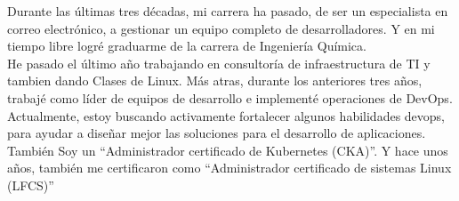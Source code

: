 \documentclass[letter,10pt]{article}
\begin{document}


\hspace*{10mm}Durante las últimas tres décadas, mi carrera ha pasado, de ser un especialista en correo electrónico, a gestionar un equipo completo de desarrolladores.  Y en mi tiempo libre logré graduarme de la carrera de Ingeniería Química.\\
\vspace*{3mm}
\hspace*{10mm}He pasado el último año trabajando en consultoría de infraestructura de TI y tambien dando Clases de Linux. Más atras, durante los anteriores tres años, trabajé como líder de equipos de desarrollo e implementé operaciones de DevOps.\\
\vspace*{3mm}
\hspace*{10mm}Actualmente, estoy buscando activamente fortalecer algunos habilidades devops, para ayudar a diseñar mejor las soluciones para el desarrollo de aplicaciones. También Soy un ``Administrador certificado de Kubernetes (CKA)''. Y hace unos años, también me certificaron como ``Administrador certificado de sistemas Linux (LFCS)''
\end{document}
